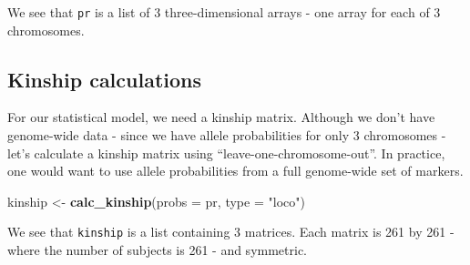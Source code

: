 \documentclass[oneside]{book}\usepackage[]{graphicx}\usepackage[]{color}
\newenvironment{Shaded}{\begin{snugshade}}{\end{snugshade}}
\newcommand{\CommentTok}[1]{\textcolor[rgb]{0.56,0.35,0.01}{\textit{#1}}}
\newcommand{\DataTypeTok}[1]{\textcolor[rgb]{0.13,0.29,0.53}{#1}}
\newcommand{\KeywordTok}[1]{\textcolor[rgb]{0.13,0.29,0.53}{\textbf{#1}}}
\newcommand{\NormalTok}[1]{#1}
\newcommand{\StringTok}[1]{\textcolor[rgb]{0.31,0.60,0.02}{#1}}
\begin{document}
We see that \texttt{pr} is a list of 3 three-dimensional arrays - one
array for each of 3 chromosomes.

\hypertarget{kinship-calculations}{%
\subsection{Kinship calculations}\label{kinship-calculations}}

For our statistical model, we need a kinship matrix. Although we don't
have genome-wide data - since we have allele probabilities for only 3
chromosomes - let's calculate a kinship matrix using
``leave-one-chromosome-out''. In practice, one would want to use allele
probabilities from a full genome-wide set of markers.

\begin{Shaded}
\begin{Highlighting}[]
\NormalTok{kinship <-}\StringTok{ }\KeywordTok{calc_kinship}\NormalTok{(}\DataTypeTok{probs =}\NormalTok{ pr, }\DataTypeTok{type =} \StringTok{"loco"}\NormalTok{)}
\end{Highlighting}
\end{Shaded}

\begin{Shaded}
\end{Shaded}

We see that \texttt{kinship} is a list containing 3 matrices. Each
matrix is 261 by 261 - where the number of subjects is 261 - and
symmetric.
\end{document}

